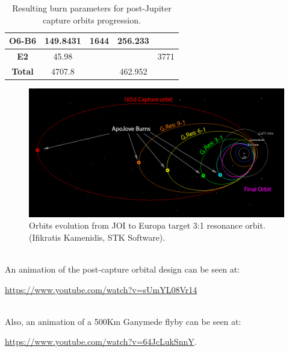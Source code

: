 \begin{table}[htb!]
\begin{tabular}{|r|r|r|r|r|}
    \hline
    \multicolumn{1}{|c|}{\textbf{O6-B6}} & \multicolumn{1}{c|}{149.8431} & \multicolumn{1}{c|}{1644} & \multicolumn{1}{c|}{256.233} & \multicolumn{1}{c|}{} \bigstrut\\
    \hline
    \multicolumn{1}{|c|}{\textbf{E2}} & \multicolumn{1}{c|}{45.98} &       & \multicolumn{1}{c|}{} & \multicolumn{1}{c|}{3771} \bigstrut\\
    \hline
    \multicolumn{1}{|c|}{\textbf{Total }} & \multicolumn{1}{c|}{4707.8} &       & \multicolumn{1}{c|}{462.952} & \multicolumn{1}{c|}{} \bigstrut\\
    \hline
    \end{tabular}%
    \caption{Resulting burn parameters for post-Jupiter capture orbits progression.}
  \label{tab:boardm}%
\end{table}%

\begin{figure}[htb!]
\centering
\includegraphics[width=\textwidth]{figures/Orbiter/orbits.png}
\caption{Orbits evolution from JOI to Europa target 3:1 resonance orbit. (Ifikratis Kamenidis, STK Software).}\label{fig:orbits_resonance}
\end{figure}
\begin{description}[align=left]
\item [Post-capture orbital design]\hfill \\
An animation of the post-capture orbital design can be seen at:

\url{https://www.youtube.com/watch?v=sUmYL08Vr14}
\item [Ganymede Flyby]\hfill \\
Also, an animation of a 500Km Ganymede flyby can be seen at:

\url{https://www.youtube.com/watch?v=64JcLukSnnY}.
\end{description}
